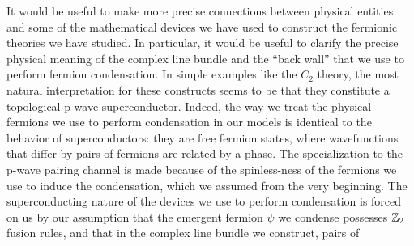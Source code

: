 It would be useful to make more precise connections between physical entities and some of the mathematical 
devices we have used to construct the fermionic theories 
we have studied. 
In particular, it would be useful to clarify the precise physical meaning of the complex line bundle 
and the ``back wall'' that we use to perform fermion condensation. 
In simple examples like the $C_2$ theory, the most natural interpretation for these constructs 
seems to be that they constitute a topological p-wave superconductor.
Indeed, the way we treat the physical fermions we use to perform condensation 
in our models is identical to the behavior of 
superconductors: they are 
free fermion states, 
where wavefunctions that differ by pairs of 
fermions are related by a phase. 
The specialization to the p-wave pairing channel is made because of the spinless-ness
of the fermions we use to induce the condensation, which we assumed from the very 
beginning.  
The superconducting nature of the devices we use to perform condensation is forced on us
by our assumption that the emergent fermion $\psi$ we condense possesses $\mathbb{Z}_2$
fusion rules, and that in the complex line bundle we construct, pairs of
